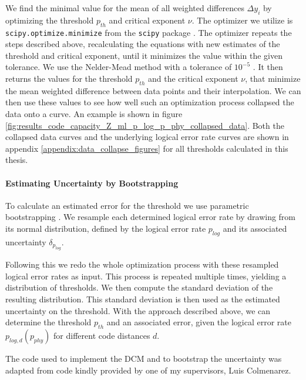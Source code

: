 We find the minimal value for the mean of all weighted differences $\Delta y_i$
by optimizing the threshold $p_{th}$ and critical exponent $\nu$.
The optimizer we utilize is \texttt{scipy.optimize.minimize} from the \texttt{scipy} package \cite{Scipy}.
The optimizer repeats the steps described above, recalculating the equations with new estimates of the threshold and critical exponent, 
until it minimizes the value within the given tolerance.
We use the Nelder-Mead method with a tolerance of $10^{-5}$ \cite{Scipy}.
It then returns the values for the threshold $p_{th}$ and the critical exponent $\nu$, 
that minimize the mean weighted difference between data points and their interpolation.
We can then use these values to see how well such an optimization process collapsed the data onto a curve.
An example is shown in figure \ref{fig:results_code_capacity_Z_ml_p_log_p_phy_collapsed_data}.
Both the collapsed data curves and the underlying logical error rate curves are shown in appendix \ref{appendix:data_collapse_figures} for all thresholds calculated in this thesis.

\paragraph*{Estimating Uncertainty by Bootstrapping}\label{sssec:bootstrapping_error}

To calculate an estimated error for the threshold we use parametric bootstrapping \cite{bootstrap}.
We resample each determined logical error rate by drawing from its normal distribution, 
defined by the logical error rate $p_{log}$ and its associated uncertainty $\delta_{p_{log}}$.

Following this we redo the whole optimization process with these resampled logical error rates as input.
This process is repeated multiple times, yielding a distribution of thresholds.
We then compute the standard deviation of the resulting distribution. 
This standard deviation is then used as the estimated uncertainty on the threshold.
With the approach described above, we can determine the threshold $p_{th}$ and an associated error, given the logical error rate $p_{log,d}(p_{phy})$ for different code distances $d$.

The code used to implement the DCM and to bootstrap the uncertainty was adapted from code kindly provided by one of my supervisors, Luis Colmenarez.
